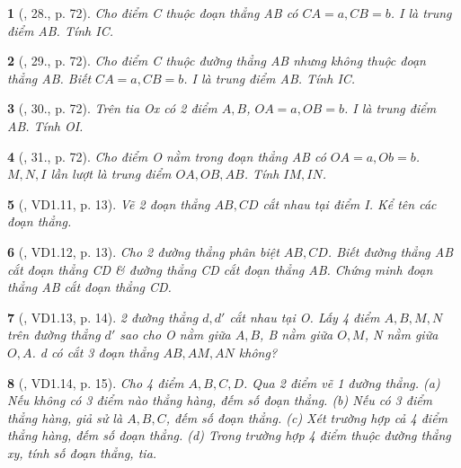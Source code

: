\documentclass{article}
\newtheorem{baitoan}{}
\begin{document}
\begin{baitoan}[\cite{Binh_Toan_6_tap_2}, 28., p. 72]
	Cho điểm C thuộc đoạn thẳng AB có $CA = a,CB = b$. I là trung điểm AB. Tính IC.
\end{baitoan}

\begin{baitoan}[\cite{Binh_Toan_6_tap_2}, 29., p. 72]
	Cho điểm C thuộc đường thẳng AB nhưng không thuộc đoạn thẳng AB. Biết $CA = a,CB = b$. I là trung điểm AB. Tính IC.
\end{baitoan}

\begin{baitoan}[\cite{Binh_Toan_6_tap_2}, 30., p. 72]
	Trên tia Ox có 2 điểm $A,B$, $OA = a,OB = b$. I là trung điểm AB. Tính OI.
\end{baitoan}

\begin{baitoan}[\cite{Binh_Toan_6_tap_2}, 31., p. 72]
	Cho điểm O nằm trong đoạn thẳng AB có $OA = a,Ob = b$. $M,N,I$ lần lượt là trung điểm $OA,OB,AB$. Tính $IM,IN$.
\end{baitoan}

\begin{baitoan}[\cite{TLCT_THCS_Toan_6_hinh_hoc}, VD1.11, p. 13]
	Vẽ 2 đoạn thẳng $AB,CD$ cắt nhau tại điểm I. Kể tên các đoạn thẳng.
\end{baitoan}

\begin{baitoan}[\cite{TLCT_THCS_Toan_6_hinh_hoc}, VD1.12, p. 13]
	Cho 2 đường thẳng phân biệt $AB,CD$. Biết đường thẳng AB cắt đoạn thẳng CD \& đường thẳng CD cắt đoạn thẳng AB. Chứng minh đoạn thẳng AB cắt đoạn thẳng CD.
\end{baitoan}

\begin{baitoan}[\cite{TLCT_THCS_Toan_6_hinh_hoc}, VD1.13, p. 14]
	2 đường thẳng $d,d'$ cắt nhau tại O. Lấy 4 điểm $A,B,M,N$ trên đường thẳng $d'$ sao cho O nằm giữa $A,B$, B nằm giữa $O,M$, N nằm giữa $O,A$. d có cắt 3 đoạn thẳng $AB,AM,AN$ không?
\end{baitoan}

\begin{baitoan}[\cite{TLCT_THCS_Toan_6_hinh_hoc}, VD1.14, p. 15]
	Cho 4 điểm $A,B,C,D$. Qua 2 điểm vẽ 1 đường thẳng. (a) Nếu không có 3 điểm nào thẳng hàng, đếm số đoạn thẳng. (b) Nếu có 3 điểm thẳng hàng, giả sử là $A,B,C$, đếm số đoạn thẳng. (c) Xét trường hợp cả 4 điểm thẳng hàng, đếm số đoạn thẳng. (d) Trong trường hợp 4 điểm thuộc đường thẳng xy, tính số đoạn thẳng, tia.
\end{baitoan}
\end{document}
